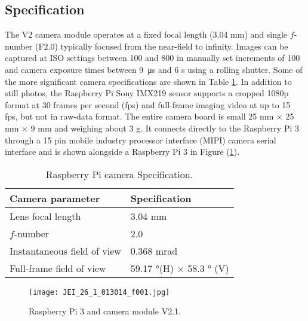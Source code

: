 \subsection{Specification}
\label{ssec:raspcamspecification}
The V2 camera module operates at a fixed focal length (3.04 \si{\milli\meter})
and single $f$-number (F$2.0$) typically focused from the near-field to
infinity. Images can be captured at ISO settings between 100 and 800 in manually
set increments of 100
and camera exposure times between \SI{9}{\micro\second} and 6 \si{\second} using
a rolling shutter. Some of the more significant camera specifications are shown
in Table \ref{tab:raspicamspec2}. In addition to still photos, the Raspberry Pi
Sony IMX219 sensor supports a cropped 1080p format at 30 frames per second (fps)
and full-frame imaging video at up to 15 fps, but not in raw-data format. The
entire camera board is small 25 \si{\milli\meter} $\times$ 25 \si{\milli\meter}
$\times$ 9 \si{\milli\meter} and weighing about $3$ \si{\gram}. \hfill \break \newline
It connects directly to the Raspberry Pi 3 through a 15 pin mobile industry processor
interface (MIPI) camera serial interface and is shown alongside a Raspberry Pi 3
in Figure (\ref{fig:boardcam}).\cite{upton2016raspberry, raspberrycam}
%
\begin{table}[htb]
	\centering
	\caption{Raspberry Pi camera Specification.}
	\label{tab:raspicamspec2}
	\begin{tabular}{l l}
		\hline
		\textbf{Camera parameter}			& 	\textbf{Specification}\\
		\hline
		\rowcolor{aliceblue!85}Lens focal length 	& 	3.04 \si{\milli\meter}	\\
		$f$-number			&	2.0	\\
		\rowcolor{aliceblue!85}Instantaneous field of view	&	0.368 \si{\milli\radian}\\
		Full-frame field of view & 59.17 \si{\degree}(H) $\times$ 58.3 \si{\degree} (V)\\
		\hline
	\end{tabular}
\end{table}
%

\begin{figure}[htb]
	\centering
    \texttt{[image: JEI\_26\_1\_013014\_f001.jpg]}
    \caption{Raspberry Pi 3 and camera module V2.1.}
    \label{fig:boardcam}
\end{figure}